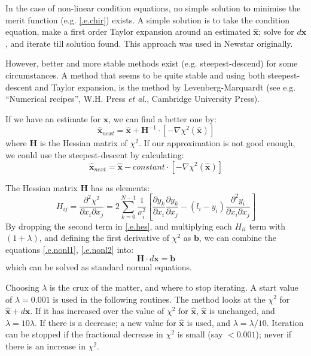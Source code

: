 In the case of non-linear condition equations, no simple solution to minimise
the merit function (e.g. \eqref{.e.chir}) exists. A simple solution
is to take the condition equation, make a first order Taylor expansion around
an estimated $\hat{\mathbf{x}}$; solve for $d\mathbf{x}$, and iterate till
solution found. This approach was used in Newstar originally.

However, better and more stable methods exist (e.g. steepest-descend) for
some circumstances. A method that seems to be quite stable and using both
steepest-descent and Taylor expansion, is the method by Levenberg-Marquardt
(see e.g. ``Numerical recipes'', W.H. Press {\em et al.}, Cambridge
University Press).

If we have an estimate for $\mathbf{x}$, we can find a better one by:
\begin{equation}
	\hat{\mathbf{x}}_{next}=\hat{\mathbf{x}}+\mathbf{H}^{-1}\cdot
		\left[ -\nabla\chi^{2}(\hat{\mathbf{x}})\right]
\label{.e.nonl1}
\end{equation}
where $\mathbf{H}$ is the Hessian matrix of $\chi^{2}$. If our approximation
is not good enough, we could use the steepest-descent by calculating:
\begin{equation}
	\hat{\mathbf{x}}_{next}=\hat{\mathbf{x}}-\mathit{constant}\cdot
		\left[ -\nabla\chi^{2}(\hat{\mathbf{x}})\right]
\label{.e.nonl2}
\end{equation}

The Hessian matrix $\mathbf{H}$ has as elements:
\begin{equation}
	H_{ij} =
	\frac{\partial^{2}\chi^{2}}{\partial x_{i}\partial x_{j}} =
	2\sum_{k=0}^{N-1}\frac{1}{\sigma_{i}^{2}} \left[
		\frac{\partial y_{k}}{\partial x_{i}}
		\frac{\partial y_{k}}{\partial x_{j}}-
		\left( l_{i}-y_{i}\right)
		\frac{\partial^{2}y_{i}}{\partial x_{i} \partial x_{j}}\right]
\label{.e.hes}
\end{equation}
By dropping the second term in \eqref{.e.hes}, and multiplying each
$H_{ii}$ term with $(1+\lambda)$, and defining the first derivative of
$\chi^{2}$ as $\mathbf{b}$, we can combine the equations \eqref{.e.nonl1},
\eqref{.e.nonl2} into:
\begin{equation}
	\mathbf{H}\cdot d\mathbf{x} = \mathbf{b}
\end{equation}
which can be solved as standard normal equations.

Choosing $\lambda$ is the crux of the matter, and where to stop iterating. A
start value of $\lambda=0.001$ is used in the following routines. The method
looks at the $\chi^{2}$ for $\hat{\mathbf{x}}+d\mathbf{x}$. If it has increased
over the value of $\chi^{2}$ for $\hat{\mathbf{x}}$, $\hat{\mathbf{x}}$ is
unchanged, and $\lambda=10\lambda$. If there is a decrease; a new value for
$\hat{\mathbf{x}}$ is used, and $\lambda=\lambda / 10$. Iteration can be
stopped if the fractional decrease in $\chi^{2}$ is small (say $<0.001$);
never if there is an increase in $\chi^{2}$.

